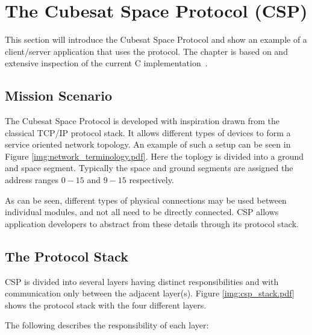 \chapter{The Cubesat Space Protocol (CSP)}
\label{chapter:csp}
This section will introduce the Cubesat Space Protocol and show an example of a client/server application that uses the protocol. The chapter is based on \cite{GomSpace, GomSpace:CSP} and extensive inspection of the current C implementation~\cite{GomSpace:CSPsrcGit}.

\section{Mission Scenario}
The Cubesat Space Protocol is developed with inspiration drawn from the classical TCP/IP protocol stack. It allows different types of devices to form a service oriented network topology. An example of such a setup can be seen in Figure \ref{img:network_terminology.pdf}. Here the toplogy is divided into a ground and space segment. Typically the space and ground segments are assigned the address ranges $0-15$ and $9-15$ respectively.

As can be seen, different types of physical connections may be used between individual modules, and not all need to be directly connected. CSP allows application developers to abstract from these details through its protocol stack.

\section{The Protocol Stack}
CSP is divided into several layers having distinct responsibilities and with communication only between the adjacent layer(s). Figure \ref{img:csp_stack.pdf} shows the protocol stack with the four different layers.


The following describes the responsibility of each layer:

